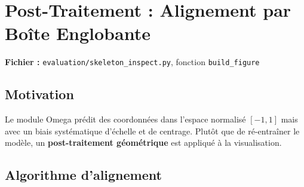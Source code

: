 \documentclass[12pt,a4paper]{article}
\begin{document}
\section{Post-Traitement : Alignement par Boîte Englobante}

\textbf{Fichier :} \texttt{evaluation/skeleton\_inspect.py}, fonction \texttt{build\_figure}

\subsection{Motivation}

Le module Omega prédit des coordonnées dans l'espace normalisé $[-1,1]$ mais avec
un biais systématique d'échelle et de centrage. Plutôt que de ré-entraîner le
modèle, un \textbf{post-traitement géométrique} est appliqué à la visualisation.

\subsection{Algorithme d'alignement}
\end{document}

